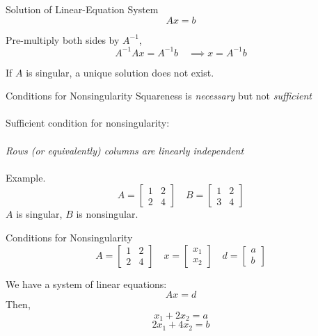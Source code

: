 \documentclass{./../../Latex/teaching_slides}
\begin{document}
\begin{frame}{Solution of Linear-Equation System}
$$ Ax = b $$
\pause

\vspace{1em}
Pre-multiply both sides by $A^{-1}$, 
$$ A^{-1} Ax = A^{-1} b \quad \implies x = A^{-1} b $$

\pause If $A$ is singular, a unique solution does not exist. 
\end{frame}

\begin{frame}{Conditions for Nonsingularity}
  Squareness is \textit{necessary} but not  \textit{sufficient} \\~\\
  Sufficient condition for nonsingularity: \\~\\
  \hspace{1em} \textit{Rows (or equivalently) columns are linearly independent} \\~\\
  Example. $$
  A=\left[\begin{array}{ll}
  1 & 2 \\
  2 & 4
  \end{array}\right]
  \quad
  B=\left[\begin{array}{ll}
  1 & 2 \\
  3 & 4
  \end{array}\right]
  $$
  \pause $A$ is singular, $B$ is nonsingular.
  \end{frame}
  
  \begin{frame}{Conditions for Nonsingularity}
  $$
  A=\left[\begin{array}{ll}
  1 & 2 \\
  2 & 4
  \end{array}\right]
  \quad  x=\left[\begin{array}{ll}
  x_1 \\
  x_2
  \end{array}\right]
  \quad d=\left[\begin{array}{ll}
  a \\
  b
  \end{array}\right]
  $$
  \vspace{1em}
  
  We have a system of linear equations:
  $$ Ax = d $$
  Then, 
  $$ x_1+2x_2 = a $$
  $$ 2x_1+4x_2 = b $$
  \end{frame}
  
\end{document}
